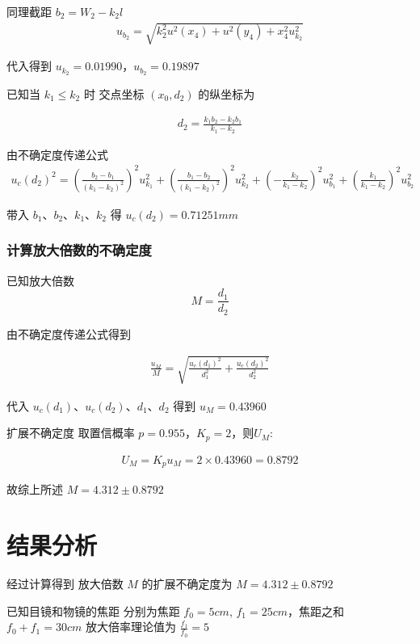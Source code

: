 \documentclass[UTF8]{ctexart}
\begin{document}
同理截距 $b_2 = W_2 - k_2l$
\begin{align*}
    u_{b_2} = \sqrt{
    k_2^2u^2(x_4) +
    u^2(y_4) +
    x_4^2u^2_{k_2}
     }
\end{align*}

代入得到 $u_{k_2} = 0.01990  $，$u_{b_2} = 0.19897 $

已知当 $k_1 \le k_2$ 时 交点坐标 $(x_0,d_2)$ 的纵坐标为

\begin{align*}
    d_2 = \frac{k_1 b_2 - k_2 b_1}{k_1 - k_2}
\end{align*}

由不确定度传递公式
\begin{align*}
    u_c(d_2)^2 = 
    \left( \frac{b_2 - b_1}{(k_1 - k_2)^2} \right)^2 u_{k_1}^2 +
    \left( \frac{b_1 - b_2}{(k_1 - k_2)^2} \right)^2 u_{k_2}^2 +
    \left( -\frac{k_2}{k_1 - k_2} \right)^2 u_{b_1}^2 +
    \left( \frac{k_1}{k_1 - k_2} \right)^2 u_{b_2}^2
\end{align*}

带入 $b_1$、$b_2$、$k_1$、$k_2$ 得 $u_c(d_2) = 0.71251 mm $

\subsubsection{计算放大倍数的不确定度}

已知放大倍数 $$M = \frac{d_1}{d_2}$$

由不确定度传递公式得到 

\begin{align*}
    \frac{u_M}{M} = \sqrt{\frac{u_c(d_1)^2}{d_1^2} + \frac{u_c(d_2)^2}{d_2^2} } 
\end{align*}


代入 $u_c(d_1)$、$u_c(d_2)$、$d_1$、$d_2$ 得到 $u_M =  0.43960$

扩展不确定度 取置信概率 $p = 0.955$，$K_p = 2$，则$U_M$:

\begin{align*}
    U_M = K_p u_M  = 2 \times 0.43960  =  0.8792 
\end{align*}

故综上所述  $M = 4.312 \pm 0.8792$



\section{结果分析}
经过计算得到 放大倍数 $M$ 的扩展不确定度为 $M = 4.312 \pm 0.8792$ 

已知目镜和物镜的焦距 分别为焦距 $f_0 = 5cm$, $f_1 = 25cm$，焦距之和 $f_0 + f_1 =30 cm$
放大倍率理论值为 $\frac{f_1}{f_0} = 5$
\end{document}
